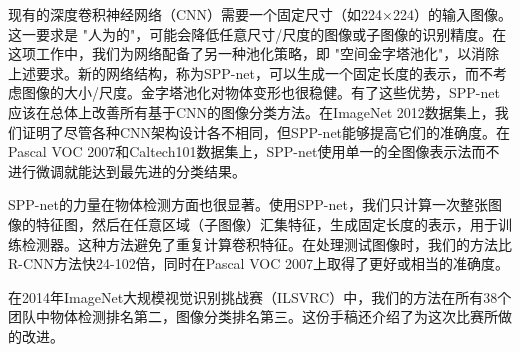 \documentclass[../main.tex]{subfile}
\begin{document}
现有的深度卷积神经网络（CNN）需要一个固定尺寸（如224×224）的输入图像。这一要求是 "人为的"，可能会降低任意尺寸/尺度的图像或子图像的识别精度。在这项工作中，我们为网络配备了另一种池化策略，即 "空间金字塔池化"，以消除上述要求。新的网络结构，称为SPP-net，可以生成一个固定长度的表示，而不考虑图像的大小/尺度。金字塔池化对物体变形也很稳健。有了这些优势，SPP-net应该在总体上改善所有基于CNN的图像分类方法。在ImageNet 2012数据集上，我们证明了尽管各种CNN架构设计各不相同，但SPP-net能够提高它们的准确度。在Pascal VOC 2007和Caltech101数据集上，SPP-net使用单一的全图像表示法而不进行微调就能达到最先进的分类结果。

SPP-net的力量在物体检测方面也很显著。使用SPP-net，我们只计算一次整张图像的特征图，然后在任意区域（子图像）汇集特征，生成固定长度的表示，用于训练检测器。这种方法避免了重复计算卷积特征。在处理测试图像时，我们的方法比R-CNN方法快24-102倍，同时在Pascal VOC 2007上取得了更好或相当的准确度。

在2014年ImageNet大规模视觉识别挑战赛（ILSVRC）中，我们的方法在所有38个团队中物体检测排名第二，图像分类排名第三。这份手稿还介绍了为这次比赛所做的改进。
\end{document}
